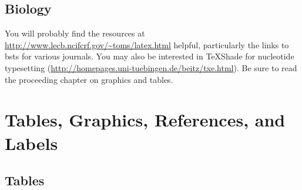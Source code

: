 \documentclass [11pt, proquest] {uwthesis}[2015/03/03]
\begin{document}
\section{Biology}\label{biology}

You will probably find the resources at
\url{http://www.lecb.ncifcrf.gov/~toms/latex.html} helpful, particularly
the links to bsts for various journals. You may also be interested in
TeXShade for nucleotide typesetting
(\url{http://homepages.uni-tuebingen.de/beitz/txe.html}). Be sure to
read the proceeding chapter on graphics and tables.

\chapter{Tables, Graphics, References, and Labels}\label{ref-labels}

\section{Tables}\label{tables}
\end{document}
